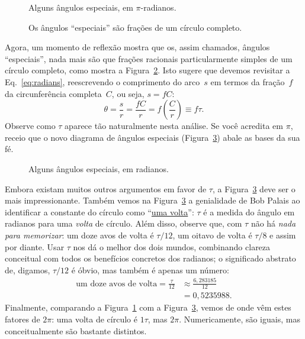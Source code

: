 \begin{figure}
\begin{center}
\end{center}
\caption{Alguns ângulos especiais, em $\pi$-radianos.\label{fig:pi_angles}}
\end{figure}

\begin{figure}
\begin{center}
\end{center}
\caption{Os ângulos ``especiais'' são frações de um círculo completo.\label{fig:angle_fractions}}
\end{figure}

Agora, um momento de reflexão mostra que os, assim chamados, ângulos ``especiais'', nada mais são que frações racionais particularmente simples de um círculo completo, como mostra a Figura~\ref{fig:angle_fractions}. Isto sugere que devemos revisitar a Eq.~\eqref{eq:radians}, reescrevendo o comprimento do arco~$s$ em termos da fração~$f$ da circunferência completa~$C$, ou seja, $s = f C$:
\[ \theta = \frac{s}{r} = \frac{fC}{r} =  f\left(\frac{C}{r}\right) \equiv f\tau. \]
Observe como $\tau$ aparece tão naturalmente nesta análise. Se você acredita em $\pi$, receio que o novo diagrama de ângulos especiais (Figura~\ref{fig:tau_angles}) abale as bases da sua fé.

\begin{figure}
\begin{center}
\end{center}
\caption{Alguns ângulos especiais, em radianos.\label{fig:tau_angles}}
\end{figure}

Embora existam muitos outros argumentos em favor de $\tau$, a Figura~\ref{fig:tau_angles} deve ser o mais impressionante. Também vemos na Figura~\ref{fig:tau_angles} a genialidade de Bob Palais ao identificar a constante do círculo como ``\href{https://pt.wikipedia.org/wiki/Volta_(geometria)}{uma volta}'': $\tau$ é a medida do ângulo em radianos para uma \emph{volta} de círculo. Além disso, observe que, com $\tau$ não há \emph{nada para memorizar}: um doze avos de volta é $\tau/12$, um oitavo de volta é $\tau/8$ e assim por diante. Usar $\tau$ nos dá o melhor dos dois mundos, combinando clareza conceitual com todos os benefícios concretos dos radianos; o significado abstrato de, digamos, $\tau/12$ é óbvio, mas também é apenas um número:
\[
\begin{split}
\mbox{um doze avos de volta} = \frac{\tau}{12} & \approx \frac{6,283185}{12} \\
                                             & = 0,5235988.
\end{split}
\]
Finalmente, comparando a Figura~\ref{fig:pi_angles} com a Figura~\ref{fig:tau_angles}, vemos de onde vêm estes fatores  de $2\pi$: uma volta de círculo é $1\tau$, mas $2\pi$. Numericamente, são iguais, mas conceitualmente são bastante distintos.

